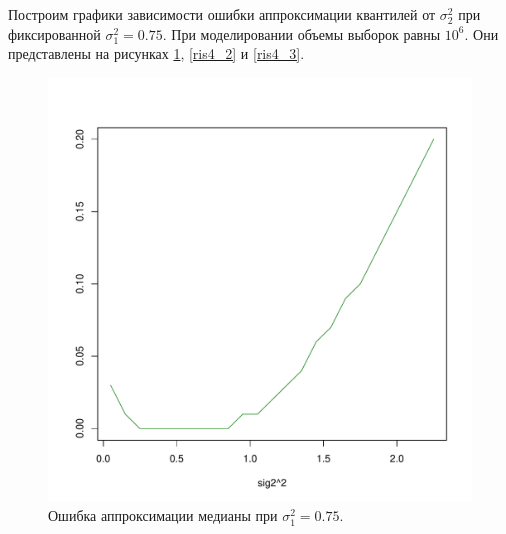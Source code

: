 \documentclass[specialist, substylefile = spbu.rtx,
subf,href,colorlinks=true, 12pt]{disser}
\begin{document}
Построим графики зависимости ошибки аппроксимации квантилей от $\sigma_{2}^{2}$ при фиксированной $\sigma_{1}^{2} = 0.75$. При моделировании объемы выборок равны $10^{6}$. Они представлены на рисунках \ref{ris4_1}, \ref{ris4_2} и \ref{ris4_3}.

\begin{figure}[!hhh]
	\begin{center}
		\begin{minipage}[h]{0.8\linewidth}
			\includegraphics[width=1\linewidth]{img_new/ris41.pdf}
			\caption{Ошибка аппроксимации медианы при $\sigma_{1}^{2} = 0.75$.} %
			\label{ris4_1} %
		\end{minipage}	
	\end{center}
\end{figure}
\end{document}
